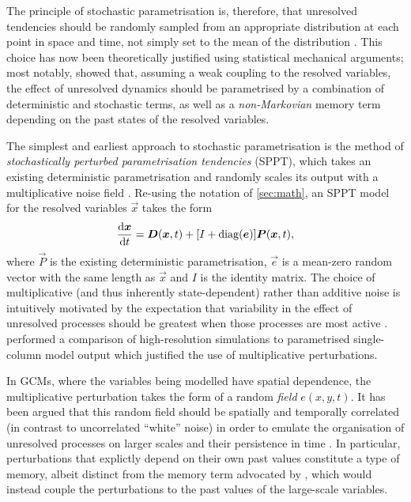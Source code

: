 \documentclass[../main.tex]{subfiles}
\begin{document}
The principle of stochastic parametrisation is, therefore, that unresolved
tendencies should be randomly sampled from an appropriate distribution at each
point in space and time, not simply set to the mean of the distribution
\parencite{franzke2015}. This choice has now been theoretically justified using
statistical mechanical arguments; most notably,
\textcite{wouters2012,wouters2013} showed that, assuming a weak coupling to the
resolved variables, the effect of unresolved dynamics should be parametrised by
a combination of deterministic and stochastic terms, as well as a
\emph{non-Markovian} memory term depending on the past states of the resolved
variables.

The simplest and earliest approach to stochastic parametrisation is the method
of \emph{stochastically perturbed parametrisation tendencies} (SPPT), which
takes an existing deterministic parametrisation and randomly scales its output
with a multiplicative noise field \parencite{palmer2019,christensen2020}.
Re-using the notation of \cref{sec:math}, an SPPT model for the resolved
variables $\vec{x}$ takes the form
\begin{equation*}
    \frac{\mathrm{d} \bm{x}}{\mathrm{d} t}
        = \bm{D}(\bm{x},t)
        + [I + \operatorname{diag}(\bm{e})] \bm{P}(\bm{x}, t),
\end{equation*}
where $\vec{P}$ is the existing deterministic parametrisation, $\vec{e}$ is a
mean-zero random vector with the same length as $\vec{x}$ and $I$ is the
identity matrix. The choice of multiplicative (and thus inherently
state-dependent) rather than additive noise is intuitively motivated by the
expectation that variability in the effect of unresolved processes should be
greatest when those processes are most active \parencite{franzke2015}.
\textcite{christensen2020} performed a comparison of high-resolution
simulations to parametrised single-column model output which justified the use
of multiplicative perturbations.

In GCMs, where the variables being modelled have spatial dependence, the
multiplicative perturbation takes the form of a random \emph{field}
$e(x,y,t)$. It has been argued that this random field should be spatially and
temporally correlated (in contrast to uncorrelated ``white'' noise) in order to
emulate the organisation of unresolved processes on larger scales and their
persistence in time \parencite{christensen2022,franzke2015}. In particular,
perturbations that explictly depend on their own past values constitute a type
of memory, albeit distinct from the memory term advocated by
\textcite{wouters2012,wouters2013}, which would instead couple the
perturbations to the past values of the large-scale variables.
\end{document}
